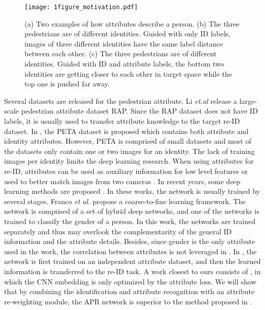 \documentclass[5p,times,twocolumn]{elsarticle}
\begin{document}
    \begin{figure}[t]
        \begin{center}
            \texttt{[image: 1figure\_motivation.pdf]}
        \end{center}
        \caption{(a) Two examples of how attributes describe a person. (b) The three pedestrians are of different identities. Guided with only ID labels, images of three different identities have the same label distance between each other. (c) The three pedestrians are of different identities. Guided with ID and attribute labels, the bottom two identities are getting closer to each other in target space while the top one is pushed far away.
        }
        \label{fig:1motivation}
    \end{figure}


Several datasets are released for the pedestrian attribute. Li \emph{et.al} \cite{li2016richly} release a large-scale pedestrian attribute dataset RAP. Since the RAP dataset does not have ID labels, it is usually used to transfer attribute knowledge to the target re-ID dataset.
In \cite{deng2014pedestrian}, the PETA dataset is proposed which contains both attribute and identity attributes. However, PETA is comprised of small datasets and most of the datasets only contain one or two images for an identity. The lack of training images per identity limits the deep learning research. When using attributes for re-ID, attributes can be used as auxiliary information for low level features \cite{layne2014re} or used to better match images from two cameras \cite{khamis2014joint,su2017attributes,su2018multitask}. 
 In recent years, some deep learning methods are proposed \cite{franco2017convolutional,su2018multitype,schumann2017person}. In these works, the network is usually trained by several stages. Franco \emph{et al.} \cite{franco2017convolutional} propose a coarse-to-fine learning framework. The network is comprised of a set of hybrid deep networks, and one of the networks is trained to classify the gender of a person. In this work, the networks are trained separately and thus may overlook the complementarity of the general ID information and the attribute details. Besides, since gender is the only attribute used in the work, the correlation between attributes is not leveraged in \cite{franco2017convolutional}. In \cite{su2018multitype,schumann2017person}, the network is first trained on an independent attribute dataset, and then the learned information is transferred to the re-ID task.
 A work closest to ours consists of \cite{matsukawa2016person}, in which the CNN embedding is only optimized by the attribute loss. We will show that by combining the identification and attribute recognition with an attribute re-weighting module, the APR network is superior to the method proposed in \cite{matsukawa2016person}. 
\end{document}
